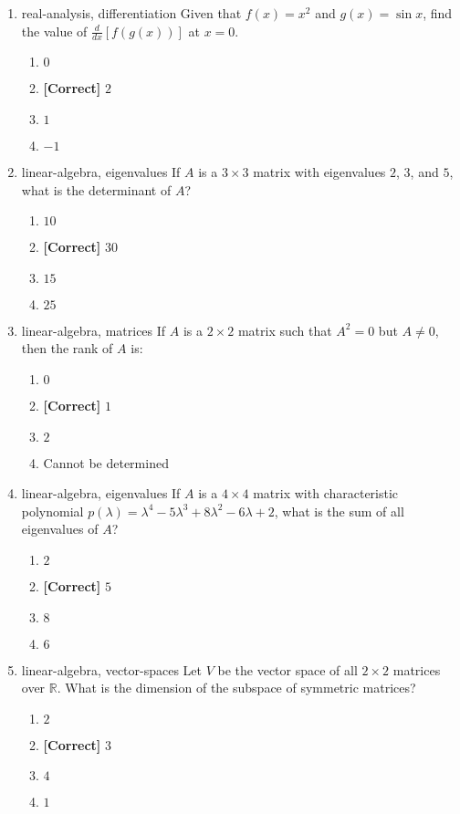 \documentclass{article}
\newenvironment{problem}{\item}{}
\newcommand{\choice}{\item}
\newcommand{\correctchoice}{\item \textbf{[Correct] }}
\newcommand{\tags}[1]{#1} %
\begin{document}
\begin{enumerate}
        \begin{problem}
            \tags{real-analysis, differentiation}
            Given that $f(x) = x^2$ and $g(x) = \sin x$, find the value of $\frac{d}{dx}[f(g(x))]$ at $x = 0$.
            \begin{enumerate}
                \choice $0$
                \correctchoice $2$
                \choice $1$
                \choice $-1$
            \end{enumerate}
        \end{problem}

        \begin{problem}
            \tags{linear-algebra, eigenvalues}
            If $A$ is a $3 \times 3$ matrix with eigenvalues $2$, $3$, and $5$, what is the determinant of $A$?
            \begin{enumerate}
                \choice $10$
                \correctchoice $30$
                \choice $15$
                \choice $25$
            \end{enumerate}
        \end{problem}
        
        \begin{problem}
            \tags{linear-algebra, matrices}
            If $A$ is a $2 \times 2$ matrix such that $A^2 = 0$ but $A \neq 0$, then the rank of $A$ is:
            \begin{enumerate}
                \choice $0$
                \correctchoice $1$
                \choice $2$
                \choice Cannot be determined
            \end{enumerate}
        \end{problem}
        
        \begin{problem}
            \tags{linear-algebra, eigenvalues}
            If $A$ is a $4 \times 4$ matrix with characteristic polynomial $p(\lambda) = \lambda^4 - 5\lambda^3 + 8\lambda^2 - 6\lambda + 2$, what is the sum of all eigenvalues of $A$?
            \begin{enumerate}
                \choice $2$
                \correctchoice $5$
                \choice $8$
                \choice $6$
            \end{enumerate}
        \end{problem}
        
        \begin{problem}
            \tags{linear-algebra, vector-spaces}
            Let $V$ be the vector space of all $2 \times 2$ matrices over $\mathbb{R}$. What is the dimension of the subspace of symmetric matrices?
            \begin{enumerate}
                \choice $2$
                \correctchoice $3$
                \choice $4$
                \choice $1$
            \end{enumerate}
        \end{problem}
        

\end{enumerate}
\end{document}

